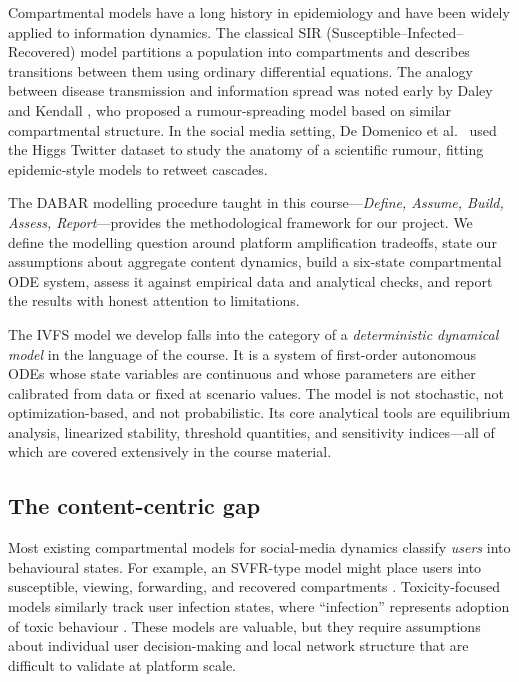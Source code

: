 \documentclass[11pt]{article}
\begin{document}
Compartmental models have a long history in epidemiology and have been widely applied to information dynamics. The classical SIR (Susceptible--Infected--Recovered) model partitions a population into compartments and describes transitions between them using ordinary differential equations. The analogy between disease transmission and information spread was noted early by Daley and Kendall \cite{daleyKendall1964}, who proposed a rumour-spreading model based on similar compartmental structure. In the social media setting, De Domenico et al.\ \cite{domenico2013} used the Higgs Twitter dataset to study the anatomy of a scientific rumour, fitting epidemic-style models to retweet cascades.

The DABAR modelling procedure taught in this course---\emph{Define, Assume, Build, Assess, Report}---provides the methodological framework for our project. We define the modelling question around platform amplification tradeoffs, state our assumptions about aggregate content dynamics, build a six-state compartmental ODE system, assess it against empirical data and analytical checks, and report the results with honest attention to limitations.

The IVFS model we develop falls into the category of a \emph{deterministic dynamical model} in the language of the course. It is a system of first-order autonomous ODEs whose state variables are continuous and whose parameters are either calibrated from data or fixed at scenario values. The model is not stochastic, not optimization-based, and not probabilistic. Its core analytical tools are equilibrium analysis, linearized stability, threshold quantities, and sensitivity indices---all of which are covered extensively in the course material.

\subsection{The content-centric gap}

Most existing compartmental models for social-media dynamics classify \emph{users} into behavioural states. For example, an SVFR-type model might place users into susceptible, viewing, forwarding, and recovered compartments \cite{liShao2024, jing2018}. Toxicity-focused models similarly track user infection states, where ``infection'' represents adoption of toxic behaviour \cite{maleki2022, addai2025}. These models are valuable, but they require assumptions about individual user decision-making and local network structure that are difficult to validate at platform scale.
\end{document}
